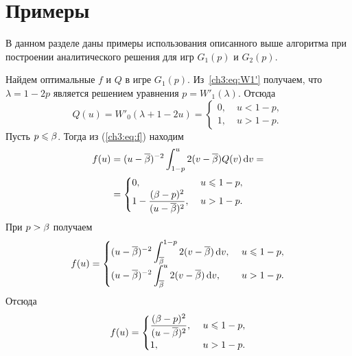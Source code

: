 {\section{Примеры}\label{ch3:sec:examples}
В данном разделе даны примеры использования описанного выше алгоритма при построении аналитического решения для игр $G_1(p)$ и $G_2(p)$.

\begin{example}
  Найдем оптимальные $f$ и $Q$ в игре $G_1(p)$.
  Из~\eqref{ch3:eq:W1'} получаем, что $\lambda = 1 - 2p$ является решением уравнения $p = W'_1(\lambda)$.
  Отсюда
  \begin{equation*}
    Q(u) = W'_0(\lambda + 1 - 2u) = \begin{cases}
      0, &\; u < 1 - p,\\
      1, &\; u > 1 - p.
    \end{cases}
  \end{equation*}
  Пусть $p \leqslant \beta$.
  Тогда из (\ref{ch3:eq:f}) находим
  \begin{align*}
    f(u) 
    &=
      (u - {{\overline{\beta}}})^{-2} \int_{1-p}^u 2 (v - {{\overline{\beta}}}) Q(v) \mathop{}\!\mathrm{d} v = \\
    &=
      \begin{cases}
        0, &\; u \leqslant 1 - p,\\
        1 - {\displaystyle \frac{(\beta - p)^2}{(u-{{\overline{\beta}}})^2}}, &\; u > 1 - p.
      \end{cases}
  \end{align*}
  При $p > \beta$ получаем
  \begin{equation*}
    f(u)= \begin{cases}
      {\displaystyle (u-\DCo)^{-2} \int_\DCo^{1-p} 2 (v - \DCo) \di v},\ & u \leq 1 - p,\\
      {\displaystyle (u - \DCo)^{-2} \int_\DCo^u 2 (v - \DCo) \di v},\ & u > 1 - p.
    \end{cases}                                                     
  \end{equation*}
  Отсюда
  \begin{equation*}
    f(u) = \begin{cases}
      {\displaystyle \frac{(\ensuremath{\beta}- p)^2}{(u - \ensuremath{{{\overline{\beta}}}})^2}},\ & u \leqslant 1 - p,\\
      1,\ & u > 1 - p.
    \end{cases}  
  \end{equation*}
\end{example}

}
